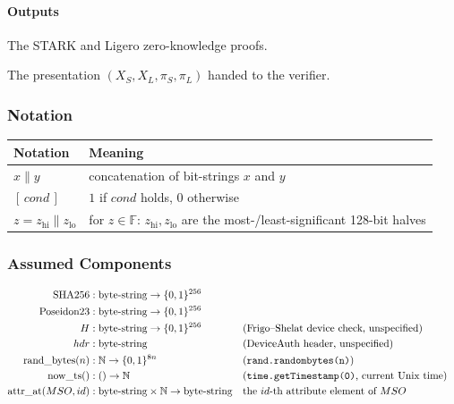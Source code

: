 \documentclass{article}
\newcommand{\FF}{\mathbb{F}}
\newcommand{\concat}{\mathbin{\|}}
\newcommand{\hipart}[1]{{#1}_{\mathrm{hi}}}
\newcommand{\lopart}[1]{{#1}_{\mathrm{lo}}}
\newcommand{\SHA}{\mathrm{SHA256}}
\newcommand{\Poseidon}{\mathrm{Poseidon23}}
\newcommand{\prand}{\mathrm{rand\_bytes}}
\newcommand{\nowts}{\mathrm{now\_ts}}
\newcommand{\attrat}{\mathrm{attr\_at}}
\begin{document}
\paragraph*{Outputs}

\begin{description}[leftmargin=3.5em, labelwidth=3em, style=sameline, itemsep=2pt]
  \item[$\pi_S,\pi_L$] The STARK and Ligero zero-knowledge proofs.
  \item[$Pres$]        The presentation $(X_S, X_L, \pi_S, \pi_L)$ handed to
                       the verifier.
\end{description}

\subsubsection{Notation}
\label{sec:notation}

\begin{center}
\renewcommand{\arraystretch}{1.35}
\begin{tabular}{@{}ll@{}}
\toprule
\textbf{Notation} & \textbf{Meaning} \\
\midrule
$x \concat y$                       & concatenation of bit-strings $x$ and $y$ \\
$[\,\mathit{cond}\,]$               & $1$ if $\mathit{cond}$ holds, $0$ otherwise \\
$z = \hipart{z} \concat \lopart{z}$ & for $z\in\FF$: $\hipart{z}, \lopart{z}$ are the most-/least-significant 128-bit halves \\
\bottomrule
\end{tabular}
\end{center}

\subsubsection{Assumed Components}
\label{sec:components}

\begin{align*}
\SHA            &: \text{byte-string} \to \{0,1\}^{256} \\
\Poseidon       &: \text{byte-string} \to \{0,1\}^{256} \\
H               &: \text{byte-string} \to \{0,1\}^{256}
  && \text{(Frigo--Shelat device check, unspecified)} \\
hdr             &: \text{byte-string}
  && \text{(DeviceAuth header, unspecified)} \\
\prand(n)       &: \mathbb{N} \to \{0,1\}^{8n}
  && \text{(\texttt{rand.randombytes(n)})} \\
\nowts()        &: () \to \mathbb{N}
  && \text{(\texttt{time.getTimestamp(0)}, current Unix time)} \\
\attrat(MSO,id) &: \text{byte-string} \times \mathbb{N} \to \text{byte-string}
  && \text{the $id$-th attribute element of $MSO$}
\end{align*}
\end{document}
